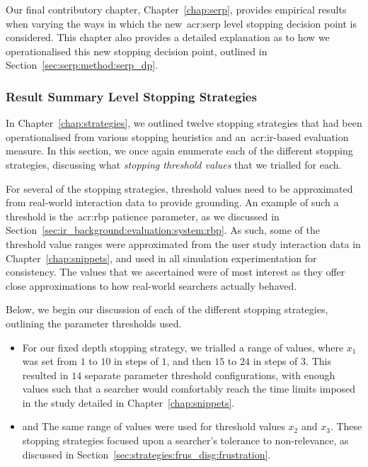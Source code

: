 Our final contributory chapter, Chapter~\ref{chap:serp}, provides empirical results when varying the ways in which the new~\gls{acr:serp} level stopping decision point is considered. This chapter also provides a detailed explanation as to how we operationalised this new stopping decision point, outlined in Section~\ref{sec:serp:method:serp_dp}.

\subsubsection{Result Summary Level Stopping Strategies}\label{sec:method:simulation:grounding:stopping}
In Chapter~\ref{chap:strategies}, we outlined twelve stopping strategies that had been operationalised from various stopping heuristics and an~\gls{acr:ir}-based evaluation measure. In this section, we once again enumerate each of the different stopping strategies, discussing what \emph{stopping threshold values} that we trialled for each.

For several of the stopping strategies, threshold values need to be approximated from real-world interaction data to provide grounding. An example of such a threshold is the~\gls{acr:rbp} patience parameter, as we discussed in Section~\ref{sec:ir_background:evaluation:system:rbp}. As such, some of the threshold value ranges were approximated from the user study interaction data in Chapter~\ref{chap:snippets}, and used in all simulation experimentation for consistency. The values that we ascertained were of most interest as they offer close approximations to how real-world searchers actually behaved.

Below, we begin our discussion of each of the different stopping strategies, outlining the parameter thresholds used.

\begin{itemize}
    \item{ For our fixed depth stopping strategy, we trialled a range of values, where $x_1$ was set from $1$ to $10$ in steps of $1$, and then $15$ to $24$ in steps of $3$. This resulted in $14$ separate parameter threshold configurations, with enough values such that a searcher would comfortably reach the time limits imposed in the study detailed in Chapter~\ref{chap:snippets}.}
    
    \item{ and  The same range of values were used for threshold values $x_2$ and $x_3$. These stopping strategies focused upon a searcher's tolerance to non-relevance, as discussed in Section~\ref{sec:strategies:frus_disg:frustration}.}
\end{itemize}

